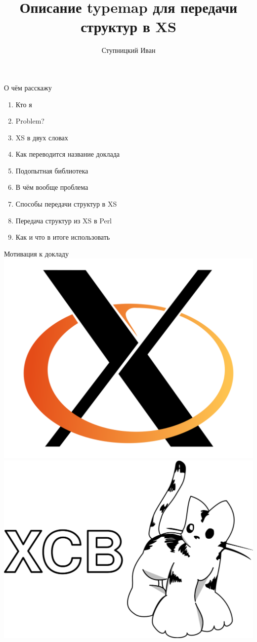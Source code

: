 
\title{Описание typemap для передачи структур в XS}
\author{Ступницкий Иван}

\titleframe

\begin{frame}[fragile]{О чём расскажу}
    \begin{enumerate}
        \item Кто я
        \item Problem?
        \item XS в двух словах
        \item Как переводится название доклада
        \item Подопытная библиотека
        \item В чём вообще проблема
        \item Способы передачи структур в XS
        \item Передача структур из XS в Perl
        \item Как и что в итоге использовать
    \end{enumerate}
\end{frame}


\begin{frame}[fragile]{Мотивация к докладу}
    \centering
    \includegraphics[width=.4\textwidth]{snippets/xorg_logo.png}\hfill
    \includegraphics[width=.4\textwidth]{snippets/xcb_logo.png}\hfill
\end{frame}

